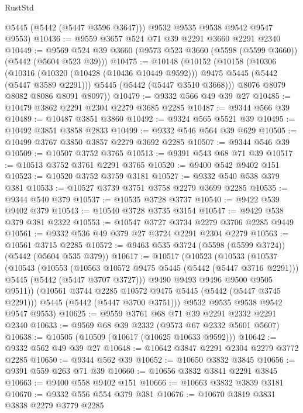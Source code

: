 \begin{lexlean}{RustStd}
\begin{coremodule}
{\begin{coremodule}
{{{{{{{{{{{{        @5445
        (@5442 (@5447 @3596 @3647)))
      @9532
      @9535
      @9538
      @9542
      @9547
      @9553)
@10436 := @9559 @3657 @524 @71 @39 @2291 @3660 @2291 @2340
@10449 := @9569 @524 @39 @3660 (@9573 @523 @3660 (@5598 (@5599 @3660)) (@5442 (@5604 @523 @39)))
@10475 := @10148
    (@10152
      (@10158
        (@10306
          (@10316 (@10320 (@10428 (@10436 @10449 @9592))) @9475 @5445 (@5442 (@5447 @3589 @2291)))
          @5445
          (@5442 (@5447 @3510 @3668)))
        @8076
        @8079
        @8082
        @8086
        @8091
        @8097))
@10479 := @9332 @566 @49 @39 @27
@10485 := @10479 @3862 @2291 @2304 @2279 @3685 @2285
@10487 := @9344 @566 @39
@10489 := @10487 @3851 @3860
@10492 := @9324 @565 @5521 @39
@10495 := @10492 @3851 @3858 @2833
@10499 := @9332 @546 @564 @39 @629
@10505 := @10499 @3767 @3850 @3857 @2279 @3692 @2285
@10507 := @9344 @546 @39
@10509 := @10507 @3752 @3765
@10513 := @9391 @543 @68 @71 @39
@10517 := @10513 @3752 @3761 @2291 @3765
@10520 := @9400 @542 @9402 @151
@10523 := @10520 @3752 @3759 @3181
@10527 := @9332 @540 @538 @379 @381
@10533 := @10527 @3739 @3751 @3758 @2279 @3699 @2285
@10535 := @9344 @540 @379
@10537 := @10535 @3728 @3737
@10540 := @9422 @539 @9402 @379
@10543 := @10540 @3728 @3735 @3154
@10547 := @9429 @538 @379 @381 @2322
@10553 := @10547 @3727 @3734 @2279 @3706 @2285 @9449
@10561 := @9332 @536 @49 @379 @27 @3724 @2291 @2304 @2279
@10563 := @10561 @3715 @2285
@10572 := @9463 @535 @3724 (@5598 (@5599 @3724)) (@5442 (@5604 @535 @379))
@10617 := @10517
    (@10523
      (@10533
        (@10537
          (@10543
            (@10553
              (@10563 @10572 @9475 @5445 (@5442 (@5447 @3716 @2291)))
              @5445
              (@5442 (@5447 @3707 @3727)))
            @9490
            @9493
            @9496
            @9500
            @9505
            @9511))
        (@10561 @3744 @2285 @10572 @9475 @5445 (@5442 (@5447 @3745 @2291)))
        @5445
        (@5442 (@5447 @3700 @3751)))
      @9532
      @9535
      @9538
      @9542
      @9547
      @9553)
@10625 := @9559 @3761 @68 @71 @39 @2291 @2332 @2291 @2340
@10633 := @9569 @68 @39 @2332 (@9573 @67 @2332 @5601 @5607)
@10638 := @10505 (@10509 (@10617 (@10625 @10633 @9592)))
@10642 := @9332 @562 @49 @39 @27
@10648 := @10642 @3847 @2291 @2304 @2279 @3772 @2285
@10650 := @9344 @562 @39
@10652 := @10650 @3832 @3845
@10656 := @9391 @559 @263 @71 @39
@10660 := @10656 @3832 @3841 @2291 @3845
@10663 := @9400 @558 @9402 @151
@10666 := @10663 @3832 @3839 @3181
@10670 := @9332 @556 @554 @379 @381
@10676 := @10670 @3819 @3831 @3838 @2279 @3779 @2285
}}}}}}}}}}}}
\end{coremodule}}
\end{coremodule}
\end{lexlean}
